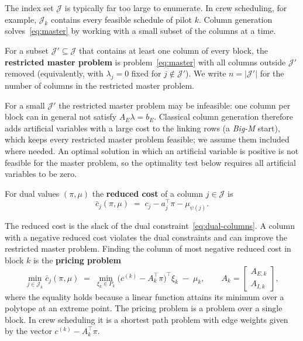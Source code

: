The index set $\mathcal{J}$ is typically far too large to enumerate. In crew scheduling, for
example, $\mathcal{J}_k$ contains every feasible schedule of pilot $k$. Column generation
solves~\eqref{eq:master} by working with a small subset of the columns at a time.

\begin{definition} \label{def:rmp}
For a subset $\mathcal{J}'\subseteq\mathcal{J}$ that contains at least one column of every
block, the \textbf{restricted master problem} is problem~\eqref{eq:master} with all columns
outside $\mathcal{J}'$ removed (equivalently, with $\lambda_j = 0$ fixed for
$j\notin\mathcal{J}'$). We write $n = |\mathcal{J}'|$ for the number of columns in the
restricted master problem.
\end{definition}

For a small $\mathcal{J}'$ the restricted master problem may be infeasible: one column per block
can in general not satisfy $A_E\lambda = b_E$. Classical column generation therefore adds
artificial variables with a large cost to the linking rows (a \emph{Big-M} start), which keeps
every restricted master problem feasible; we assume them included where needed. An optimal
solution in which an artificial variable is positive is not feasible for the master problem,
so the optimality test below requires all artificial variables to be zero.

\begin{definition} \label{def:reduced-cost}
For dual values $(\pi,\mu)$ the \textbf{reduced cost} of a column $j\in\mathcal{J}$ is
\[
\bar c_j(\pi,\mu) \;=\; c_j - a_j^\top\pi - \mu_{\psi(j)} .
\]
\end{definition}

The reduced cost is the slack of the dual constraint~\eqref{eq:dual-columns}. A column with
a negative reduced cost violates the dual constraints and can improve the restricted master
problem. Finding the column of most negative reduced cost in block $k$ is the
\textbf{pricing problem}
\begin{equation} \label{eq:pricing}
\min_{j\in\mathcal{J}_k}\bar c_j(\pi,\mu)
\;=\; \min_{\xi_k\in P_k}\bigl(c^{(k)} - A_k^\top\pi\bigr)^\top \xi_k \;-\;\mu_k,
\qquad A_k = \begin{bmatrix}A_{E,k}\\ A_{I,k}\end{bmatrix},
\end{equation}
where the equality holds because a linear function attains its minimum over a polytope at an
extreme point. The pricing problem is a problem over a single block. In crew scheduling it
is a shortest path problem with edge weights given by the vector $c^{(k)} - A_k^\top\pi$.

